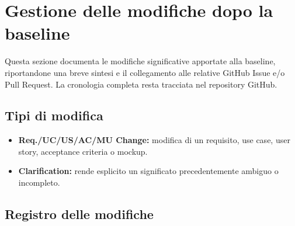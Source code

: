 \section{Gestione delle modifiche dopo la baseline}

Questa sezione documenta le modifiche significative apportate alla baseline, riportandone una breve sintesi e il collegamento alle relative GitHub Issue e/o Pull Request. La cronologia completa resta tracciata nel repository GitHub.

\subsection*{Tipi di modifica}
\begin{itemize}
    \item \textbf{Req./UC/US/AC/MU Change:} modifica di un requisito, use case, user story, acceptance criteria o mockup.
    \item \textbf{Clarification:} rende esplicito un significato precedentemente ambiguo o incompleto.
\end{itemize}

\subsection*{Registro delle modifiche}

